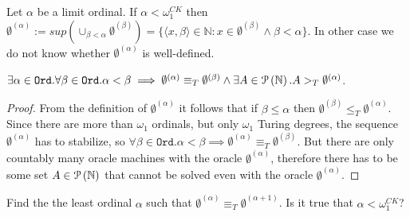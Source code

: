 Let $\alpha$ be a limit ordinal. If $\alpha < \omega_1^{CK}$ then $\emptyset^{(\alpha)}:=sup(\cup_{\beta < \alpha} \emptyset^{(\beta)})=\{\langle x, \beta \rangle \in \mathbb{N} : x \in \emptyset^{(\beta)} \land \beta < \alpha\}$. In other case we do not know whether $\emptyset^{(\alpha)}$ is well-defined.

\begin{proposition}
$\exists \alpha \in \mathtt{Ord}. \forall \beta \in \mathtt{Ord}. \alpha < \beta \implies \emptyset^{(\alpha)} \equiv_T \emptyset^{(\beta)} \land \exists A \in \mathcal{P} \left({ \mathbb{N} }\right). A >_T \emptyset^{(\alpha)}$.
\end{proposition}

\begin{proof}
From the definition of $\emptyset^{(\alpha)}$ it follows that if $\beta \le \alpha$ then $\emptyset^{(\beta)} \le_T \emptyset^{(\alpha)}$. Since there are more than $\omega_1$ ordinals, but only $\omega_1$ Turing degrees, the sequence $\emptyset^{(\alpha)}$ has to stabilize, so $\forall \beta \in \mathtt{Ord}. \alpha < \beta \implies \emptyset^{(\alpha)} \equiv_T \emptyset^{(\beta)}$. But there are only countably many oracle machines with the oracle $\emptyset^{(\alpha)}$, therefore there has to be some set $A \in \mathcal{P} \left({ \mathbb{N} }\right)$ that cannot be solved even with the oracle $\emptyset^{(\alpha)}$.
\end{proof}

\begin{problem}
Find the the least ordinal $\alpha$ such that $\emptyset^{(\alpha)} \equiv_T \emptyset^{(\alpha+1)}$. Is it true that $\alpha < \omega_1^{CK}$?
\end{problem}